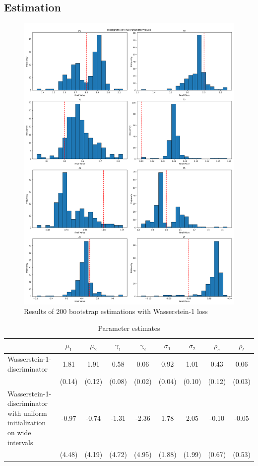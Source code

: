 \subsection{Estimation}

\begin{figure}
    \includegraphics[width=\textwidth]{./Images/main_case_histograms.png}
    \caption{Results of 200 bootstrap estimations with Wasserstein-1 loss}
    \label{fig:main_case_histrograms}
\end{figure}

\begin{table}
    \centering
    \begin{tabular}{|l|c|c|c|c|c|c|c|c|}
    \hline
    & $\mu_1$ & $\mu_2$ & $\gamma_1$ & $\gamma_2$ & $\sigma_1$ & $\sigma_2$ & $\rho_s$ & $\rho_t$ \\
    \hline
    Wasserstein-1-discriminator & 1.81 & 1.91 & 0.58 & 0.06 & 0.92 & 1.01 & 0.43 & 0.06 \\
    & (0.14) & (0.12) & (0.08) & (0.02) & (0.04) & (0.10) & (0.12) & (0.03) \\
    \hline
    Wasserstein-1-discriminator with uniform initialization on wide intervals & -0.97 & -0.74 & -1.31 & -2.36 & 1.78 & 2.05 & -0.10 & -0.05 \\
    & (4.48) & (4.19) & (4.72) & (4.95) & (1.88) & (1.99) & (0.67) & (0.53) \\
    \hline
    \end{tabular}
    \caption{Parameter estimates}
    \label{tab:parameter_estimates}
\end{table}

